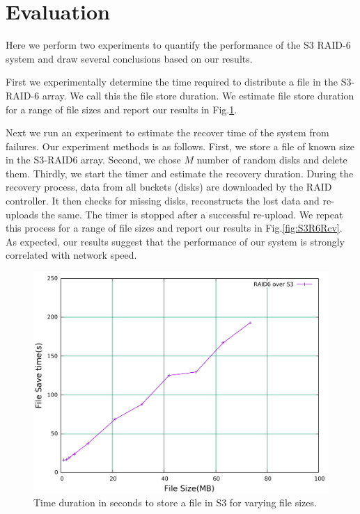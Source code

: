 \section{Evaluation}
\label{sec:evaluation}

Here we perform two experiments to quantify the performance of the S3 RAID-6 system and draw several conclusions based on our results.

First we experimentally determine the time required to distribute a file in the S3-RAID-6 array.
We call this the file store duration.
We estimate file store duration for a range of file sizes and report our results in Fig.\ref{fig:S3R6Str}.

Next we run an experiment to estimate the recover time of the system from failures.
Our experiment methods is as follows.
First, we store a file of known size in the S3-RAID6 array.
Second, we chose $M$ number of random disks and delete them.
Thirdly, we start the timer and estimate the recovery duration.
During the recovery process, data from all buckets (disks) are downloaded by the RAID controller. 
It then checks for missing disks, reconstructs the lost data and re-uploads the same.
The timer is stopped after a successful re-upload.
We repeat this process for a range of file sizes and report our results in Fig.\ref{fig:S3R6Rcv}.
As expected, our results suggest that the performance of our system is strongly correlated with network speed.

\begin{figure}[h!]
\centering
\includegraphics[width=\linewidth]{figures/S3RAIDStoreTime.pdf}
\caption{Time duration in seconds to store a file in S3 for varying file sizes.}
\label{fig:S3R6Str}
\end{figure}

